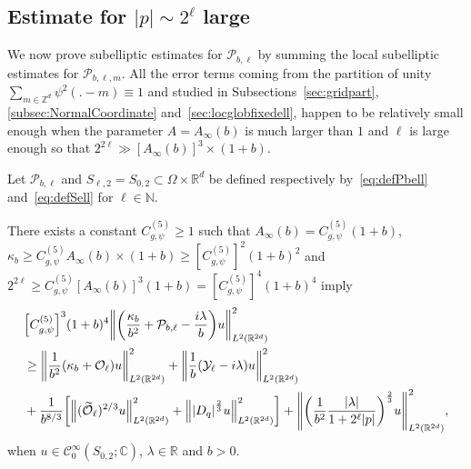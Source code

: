 \documentclass[10pt]{amsart}
\theoremstyle{definition}\newtheorem{defi}[theo]{Definition}\newtheorem{rema}[theo]{Remark}\newtheorem{exam}[theo]{Example}\newtheorem{exem}[theo]{Example}\newtheorem{nota}[theo]{Notation}
\newcommand{\C}{\mathbb{C}}
\newcommand{\Z}{\mathbb{Z}}
\newcommand{\R}{\mathbb{R}}
\newcommand{\N}{\mathbb{N}}
\newcommand{\clC}{\mathcal{C}}
\newcommand{\clY}{\mathcal{Y}}
\newcommand{\clO}{\mathcal{O}}
\newcommand{\clP}{\mathcal{P}}
\let\oldtilde\tilde
\renewcommand*{\tilde}[1]{\mathchoice{\widetilde{#1}}{\widetilde{#1}}{\oldtilde{#1}}{\oldtilde{#1}}}
\let\originalleft\left
\let\originalright\right
\renewcommand{\left}{\mathopen{}\mathclose\bgroup\originalleft}
\renewcommand{\right}{\aftergroup\egroup\originalright}
\begin{document}
\subsection{Estimate for \texorpdfstring{$|p|\sim 2^{\ell}$}{|p| sim 2\^l} large}\label{subsec:estimateForLargeEll}

We now prove subelliptic estimates for $\clP_{b,\ell}$ by summing the local subelliptic estimates for $\clP_{b,\ell,m}$. All the error terms coming from the partition of unity $\sum_{m\in\Z^{d}}\psi^{2}(.-m)\equiv 1$ and studied in Subsections~\ref{sec:gridpart}, \ref{subsec:NormalCoordinate} and~\ref{sec:locglobfixedell}, happen to be relatively small enough when the parameter $A=A_\infty (b)$ is much larger than $1$ and $\ell$ is large enough so that $2^{2\ell}\gg [A_{\infty}(b)]^3\times (1+b)$.

\begin{prop}\label{pr:subellPbellLarge}
Let $\clP_{b,\ell}$ and $S_{\ell,2}=S_{0,2}\subset \Omega\times \R^{d}$ be defined respectively by~\eqref{eq:defPbell} and~\eqref{eq:defSell} for $\ell\in\N$.

There exists a constant $C_{g,\psi}^{(5)}\geq 1$ such that $A_{\infty}(b)= C_{g,\psi}^{(5)}(1+b)$, $\kappa_{b}\geq C_{g,\psi}^{(5)}A_{\infty}(b)\times (1+b)\geq [C_{g,\psi}^{(5)}]^2(1+b)^2$ and $2^{2\ell}\geq C_{g,\psi}^{(5)}[A_{\infty}(b)]^3(1+b)=[C_{g,\psi}^{(5)}]^{4}(1+b)^4$ imply
\begin{equation}\label{eq:subellPbell}
\begin{aligned}[t]
&\left[C_{g,\psi}^{(5)}\right]^3(1+b)^4
\left\| \left(\frac{\kappa_{b}}{b^{2}} + \clP_{b,\ell} - \frac{i\lambda}{b} \right) u \right\|_{L^2(\R^{2d})}^{2} \\
&\geq \left\| \frac{1}{b^2}\left(\kappa_b+\clO_{\ell}\right) u\right\|_{L^2(\R^{2d})}^2 +
\left\| \frac{1}{b}\left(\clY_{\ell}-i \lambda \right)u \right\|_{L^2(\R^{2d})}^2
\\
&+\frac{1}{b^{8/3}}\left[\left\|(\tilde{\clO}_{\ell})^{2/3} u\right\|_{L^2(\R^{2d})}^2 + \left\|\left|D_{q} \right|^{\frac{2}{3}} u \right\|_{L^2(\R^{{2d}})}^{2}\right]
+ \left\| \left(\frac{1}{b^2} \frac{|\lambda|}{1+2^{\ell}|p|} \right)^{\frac{2}{3}} u \right\|_{L^2(\R^{2d})}^{2},
\end{aligned}
\end{equation}
when $ u \in \clC^\infty_0(S_{0,2};\C)$, $\lambda\in \R$ and $b>0$.
\end{prop}
\end{document}

